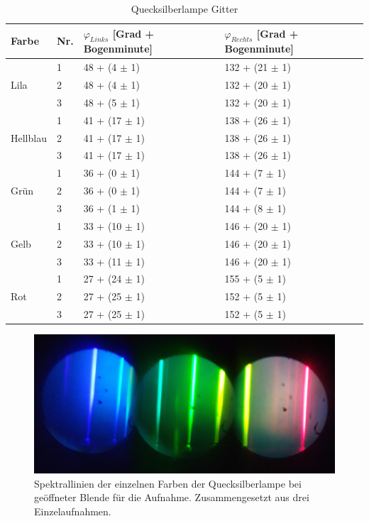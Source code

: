 \documentclass[12pt,a4paper,twoside]{article}
\begin{document}
\begin{table}[H]
    \centering
    \caption{Quecksilberlampe Gitter}
    \label{tab:Gitter v2}
    \begin{tabular}{| l | l | l | l |}
        \hline
        Farbe & Nr.  & $\varphi_{Links}$ [Grad + Bogenminute]  & $\varphi_{Rechts}$ [Grad + Bogenminute]\\
        \hline
                &  1 & 48 + (4 $\pm$ 1) & 132 + (21 $\pm$ 1) \\
        Lila     &  2 & 48 + (4 $\pm$ 1) & 132 + (20 $\pm$ 1) \\
                &  3 & 48 + (5 $\pm$ 1) & 132 + (20 $\pm$ 1) \\
        \hline
                &  1 & 41 + (17 $\pm$ 1) & 138 + (26 $\pm$ 1) \\
        Hellblau&  2 & 41 + (17 $\pm$ 1) & 138 + (26 $\pm$ 1) \\
                &  3 & 41 + (17 $\pm$ 1) & 138 + (26 $\pm$ 1) \\
        \hline
                &  1 & 36 + (0 $\pm$ 1) & 144 + (7 $\pm$ 1) \\
        Grün    &  2 & 36 + (0 $\pm$ 1) & 144 + (7 $\pm$ 1) \\
                &  3 & 36 + (1 $\pm$ 1) & 144 + (8 $\pm$ 1) \\
        \hline
                &  1 & 33 + (10 $\pm$ 1) & 146 + (20 $\pm$ 1) \\
        Gelb    &  2 & 33 + (10 $\pm$ 1) & 146 + (20 $\pm$ 1) \\
                &  3 & 33 + (11 $\pm$ 1) & 146 + (20 $\pm$ 1) \\
        \hline
                &  1 & 27 + (24 $\pm$ 1) & 155 + (5 $\pm$ 1) \\
        Rot     &  2 & 27 + (25 $\pm$ 1) & 152 + (5 $\pm$ 1) \\
                &  3 & 27 + (25 $\pm$ 1) & 152 + (5 $\pm$ 1) \\
        \hline
    \end{tabular}
\end{table}

\begin{figure}[H]
    \centering
    \includegraphics[width=0.6\linewidth]{nudes/stacked.png}
    \caption{Spektrallinien der einzelnen Farben der Quecksilberlampe bei geöffneter Blende für die Aufnahme. Zusammengesetzt aus drei Einzelaufnahmen.}
    \label{fig:spektallinienHG}
\end{figure}
\end{document}
